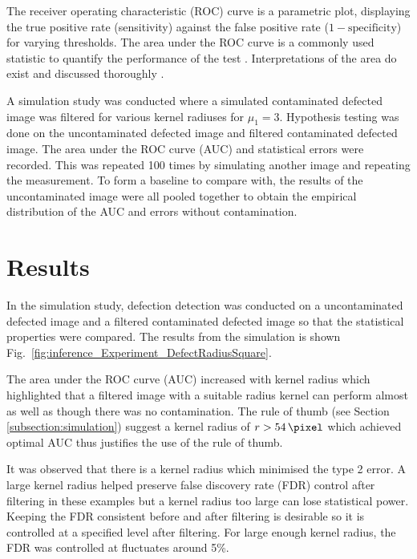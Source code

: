 \documentclass{article}
\begin{document}
The receiver operating characteristic (ROC) curve \citep{cook2007use, friedman2001elements, green1966signal, hanley1982meaning, metz1978basic} is a parametric plot, displaying the true positive rate (sensitivity) against the false positive rate ($1-\text{specificity}$) for varying thresholds. The area under the ROC curve is a commonly used statistic to quantify the performance of the test \citep{friedman2001elements}. Interpretations of the area do exist \citep{hanley1982meaning, metz1978basic} and discussed thoroughly \citep{cook2007use}.

A simulation study was conducted where a simulated contaminated defected image was filtered for various kernel radiuses for $\mu_1=3$. Hypothesis testing was done on the uncontaminated defected image and filtered contaminated defected image. The area under the ROC curve (AUC) and statistical errors were recorded. This was repeated 100 times by simulating another image and repeating the measurement. To form a baseline to compare with, the results of the uncontaminated image were all pooled together to obtain the empirical distribution of the AUC and errors without contamination.

\section{Results}

In the simulation study, defection detection was conducted on a uncontaminated defected image and a filtered contaminated defected image so that the statistical properties were compared. The results from the simulation is shown Fig.~\ref{fig:inference_Experiment_DefectRadiusSquare}.

The area under the ROC curve (AUC) increased with kernel radius which highlighted that a filtered image with a suitable radius kernel can perform almost as well as though there was no contamination. The rule of thumb (see Section \ref{subsection:simulation}) suggest a kernel radius of $r>\SI{54}{\pixel}$ which achieved optimal AUC thus justifies the use of the rule of thumb.

It was observed that there is a kernel radius which minimised the type 2 error. A large kernel radius helped preserve false discovery rate (FDR) control after filtering in these examples but a kernel radius too large can lose statistical power. Keeping the FDR consistent before and after filtering is desirable so it is controlled at a specified level after filtering. For large enough kernel radius, the FDR was controlled at fluctuates around 5\%.
\end{document}
